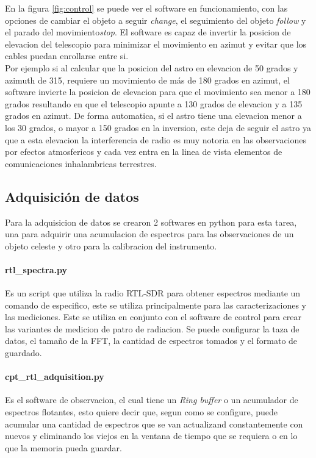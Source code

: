 En la figura \ref{fig:control} se puede ver el software en funcionamiento, con las opciones de cambiar el objeto a seguir \textit{change}, el seguimiento del objeto \textit{follow} y el parado del movimiento\textit{stop}. El software es capaz de invertir la posicion de elevacion del telescopio para minimizar el movimiento en azimut y evitar que los cables puedan enrollarse entre si.\\

Por ejemplo si al calcular que la posicion del astro en elevacion de 50 grados y azimuth de 315, requiere un movimiento de más de 180 grados en azimut, el software invierte la posicion de elevacion para que el movimiento sea menor a 180 grados resultando en que el telescopio apunte a 130 grados de elevacion y a 135 grados en azimut. De forma automatica, si el astro tiene una elevacion menor a los 30 grados, o mayor a 150 grados en la inversion, este deja de seguir el astro ya que a esta elevacion la interferencia de radio es muy notoria en las observaciones por efectos atmosfericos y cada vez entra en la linea de vista elementos de comunicaciones inhalambricas terrestres.\\

\subsection{Adquisición de datos} 

Para la adquisicion de datos se crearon 2 softwares en python para esta tarea, una para adquirir una acumulacion de espectros para las observaciones de un objeto celeste y otro para la calibracion del instrumento.\\

\paragraph{rtl\_spectra.py} Es un script que utiliza la radio RTL-SDR para obtener espectros mediante un comando de especifico, este se utiliza principalmente para las caracterizaciones y las mediciones. Este se utiliza en conjunto con el software de control para crear las variantes de medicion de patro de radiacion. Se puede configurar la taza de datos, el tamaño de la FFT, la cantidad de espectros tomados y el formato de guardado.\\

\paragraph{cpt\_rtl\_adquisition.py} Es el software de observacion, el cual tiene un \textit{Ring buffer} o un acumulador de espectros flotantes, esto quiere decir que, segun como se configure, puede acumular una cantidad de espectros que se van actualizand constantemente con nuevos y eliminando los viejos en la ventana de tiempo que se requiera o en lo que la memoria pueda guardar.\\

